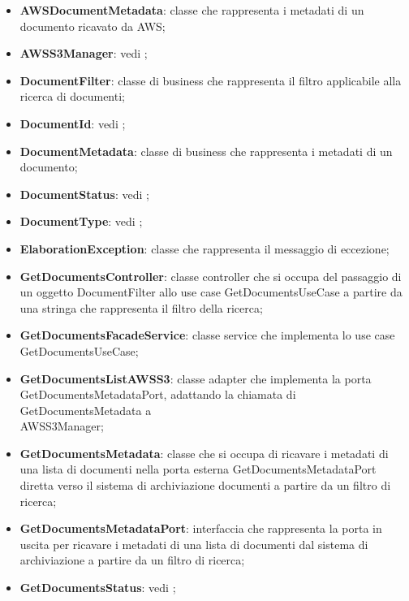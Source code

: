 \documentclass[10pt, a4paper]{article}
\begin{document}
\begin{itemize}
    \item \label{AWSDocumentMetadata}\textbf{AWSDocumentMetadata}: classe che rappresenta i metadati di un documento ricavato da AWS;
    \item \textbf{AWSS3Manager}: vedi ;
    \item \label{DocumentFilter}\textbf{DocumentFilter}: classe di business che rappresenta il filtro applicabile alla ricerca di documenti;
    \item \textbf{DocumentId}: vedi ;
    \item \label{DocumentMetadata}\textbf{DocumentMetadata}: classe di business che rappresenta i metadati di un documento;
    \item \textbf{DocumentStatus}: vedi ;
    \item \textbf{DocumentType}: vedi ;
    \item \label{ElaborationException}\textbf{ElaborationException}: classe che rappresenta il messaggio di eccezione;
     \item \label{GetDocumentsController}\textbf{GetDocumentsController}: classe controller che si occupa del passaggio di un oggetto DocumentFilter allo use case GetDocumentsUseCase a partire da una stringa che rappresenta il filtro della ricerca;
     \item \label{GetDocumentsFacadeService}\textbf{GetDocumentsFacadeService}: classe service che implementa lo use case GetDocumentsUseCase;
     \item \label{GetDocumentsListAWSS3}\textbf{GetDocumentsListAWSS3}: classe adapter che implementa la porta GetDocumentsMetadataPort, adattando la chiamata di GetDocumentsMetadata a \\AWSS3Manager;
     \item \label{GetDocumentsMetadata}\textbf{GetDocumentsMetadata}: classe che si occupa di ricavare i metadati di una lista di documenti nella porta esterna GetDocumentsMetadataPort diretta verso il sistema di archiviazione documenti a partire da un filtro di ricerca;
     \item \label{GetDocumentsMetadataPort}\textbf{GetDocumentsMetadataPort}: interfaccia che rappresenta la porta in uscita per ricavare i metadati di una lista di documenti dal sistema di archiviazione a partire da un filtro di ricerca;
     \item \textbf{GetDocumentsStatus}: vedi ;

\end{itemize}
\end{document}
